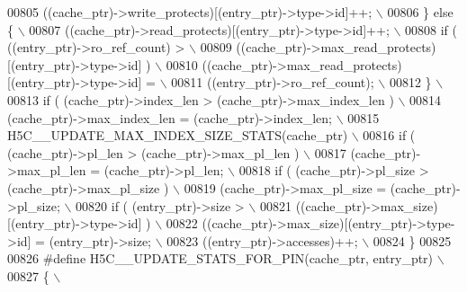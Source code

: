 \begin{DoxyCode}
00805 \textcolor{preprocessor}{        ((cache\_ptr)->write\_protects)[(entry\_ptr)->type->id]++;             \(\backslash\)}
00806 \textcolor{preprocessor}{    \} else \{                                                                \(\backslash\)}
00807 \textcolor{preprocessor}{        ((cache\_ptr)->read\_protects)[(entry\_ptr)->type->id]++;              \(\backslash\)}
00808 \textcolor{preprocessor}{        if ( ((entry\_ptr)->ro\_ref\_count) >                                  \(\backslash\)}
00809 \textcolor{preprocessor}{                ((cache\_ptr)->max\_read\_protects)[(entry\_ptr)->type->id] )   \(\backslash\)}
00810 \textcolor{preprocessor}{            ((cache\_ptr)->max\_read\_protects)[(entry\_ptr)->type->id] =       \(\backslash\)}
00811 \textcolor{preprocessor}{                    ((entry\_ptr)->ro\_ref\_count);                            \(\backslash\)}
00812 \textcolor{preprocessor}{    \}                                                                       \(\backslash\)}
00813 \textcolor{preprocessor}{    if ( (cache\_ptr)->index\_len > (cache\_ptr)->max\_index\_len )              \(\backslash\)}
00814 \textcolor{preprocessor}{        (cache\_ptr)->max\_index\_len = (cache\_ptr)->index\_len;                \(\backslash\)}
00815 \textcolor{preprocessor}{    H5C\_\_UPDATE\_MAX\_INDEX\_SIZE\_STATS(cache\_ptr)                             \(\backslash\)}
00816 \textcolor{preprocessor}{    if ( (cache\_ptr)->pl\_len > (cache\_ptr)->max\_pl\_len )                    \(\backslash\)}
00817 \textcolor{preprocessor}{        (cache\_ptr)->max\_pl\_len = (cache\_ptr)->pl\_len;                      \(\backslash\)}
00818 \textcolor{preprocessor}{    if ( (cache\_ptr)->pl\_size > (cache\_ptr)->max\_pl\_size )                  \(\backslash\)}
00819 \textcolor{preprocessor}{        (cache\_ptr)->max\_pl\_size = (cache\_ptr)->pl\_size;                    \(\backslash\)}
00820 \textcolor{preprocessor}{    if ( (entry\_ptr)->size >                                                \(\backslash\)}
00821 \textcolor{preprocessor}{            ((cache\_ptr)->max\_size)[(entry\_ptr)->type->id] )                \(\backslash\)}
00822 \textcolor{preprocessor}{        ((cache\_ptr)->max\_size)[(entry\_ptr)->type->id] = (entry\_ptr)->size; \(\backslash\)}
00823 \textcolor{preprocessor}{    ((entry\_ptr)->accesses)++;                                              \(\backslash\)}
00824 \textcolor{preprocessor}{\}}
00825 
00826 \textcolor{preprocessor}{#define H5C\_\_UPDATE\_STATS\_FOR\_PIN(cache\_ptr, entry\_ptr)      \(\backslash\)}
00827 \textcolor{preprocessor}{\{                                                            \(\backslash\)}

\end{DoxyCode}

